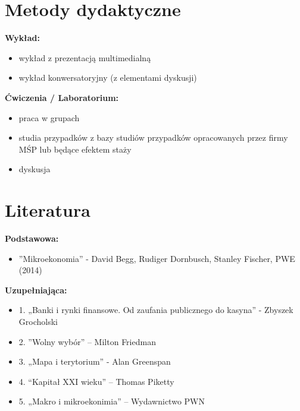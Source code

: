 \documentclass[12pt, a4paper]{article}
\begin{document}
\section{Metody dydaktyczne}

\textbf{Wykład:}
\begin{itemize}
  \item wykład z prezentacją multimedialną
  \item wykład konwersatoryjny (z elementami dyskusji)
\end{itemize}
\vspace{4pt}
\textbf{Ćwiczenia / Laboratorium:}
\begin{itemize}
  \item praca w grupach
  \item studia przypadków z bazy studiów przypadków opracowanych przez firmy MŚP lub będące efektem staży
  \item dyskusja
\end{itemize}
\vspace{4pt}


\section{Literatura}

\textbf{Podstawowa:}
\begin{itemize}
  \item ''Mikroekonomia'' - David Begg, Rudiger Dornbusch, Stanley Fischer, PWE (2014)
\end{itemize}

\textbf{Uzupełniająca:}
\begin{itemize}
  \item 1. „Banki i rynki finansowe. Od zaufania publicznego do kasyna” - Zbyszek Grocholski
  \item 2. ''Wolny wybór'' – Milton Friedman
  \item 3. „Mapa i terytorium” - Alan Greenspan
  \item 4. “Kapitał XXI wieku” – Thomas Piketty
  \item 5. „Makro i mikroekonimia” – Wydawnictwo PWN
\end{itemize}
\end{document}
